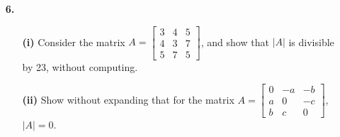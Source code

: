 \documentclass[ 12pt ]{article}
\begin{document}
\begin{enumerate}
		\begin{proof}[Computation]\renewcommand{\qedsymbol}{}
			\begin{enumerate}
				\item[\textbf{(i)}] Given our graph, we can see our adjacency matrix is $$G = \begin{bmatrix} 0 & 0 & 1 & 0 & 1 \\ 1 & 0 & 0 & 0 & 1 \\ 0 & 0 & 0 & 1 & 1 \\ 0 & 1 & 0 & 0 & 1 \\ 1 & 1 & 1 & 1 & 0 \end{bmatrix}.$$
					As a result of our lemma, we can see that $[G^3]_{12}$ is the number of unique walks of length three from node $A$ to node $B$. Moreover,
					$$[G^3]_{12} = \begin{bmatrix} 2 & 3 & 2 & 2 & 5 \\ 2 & 2 & 2 & 3 & 5 \\ 3 & 2 & 2 & 2 & 5 \\ 2 & 2 & 3 & 2 & 5 \\ 5 & 5 & 5 & 5 & 4 \end{bmatrix}_{12} = 3.$$
				\item[\textbf{(ii)}] Similiar to \textbf{(i)}, we seek the number of walks from $A$ to $B$; however we are now concerned with the sum $$\sum_{n=1}^4 [G^n]_{12} =
				0 + 1 + 3 + 7 = 11.$$
			\end{enumerate}
		\end{proof}


	\item[\textbf{6.}]
		\begin{enumerate}
			\item[\textbf{(i)}] Consider the matrix $A = \begin{bmatrix} 3 & 4 & 5 \\ 4 & 3 & 7 \\ 5 & 7 & 5 \end{bmatrix}$, and show that $|A|$ is divisible by 23, without
				computing.
			\item[\textbf{(ii)}] Show without expanding that for the matrix $A = \begin{bmatrix} 0 & -a & -b \\ a & 0 & -c \\ b & c & 0 \end{bmatrix}$, $|A| = 0$.
		\end{enumerate}


\end{enumerate}
\end{document}
